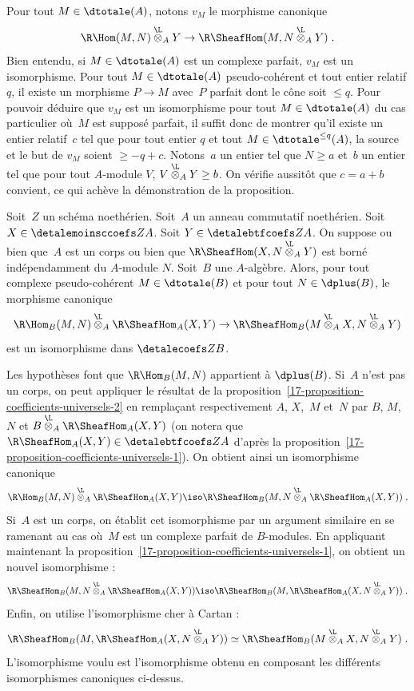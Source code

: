 \documentclass[10pt]{../fichiers-configuration-latex/smfart}
\begin{document}
Pour tout $M\in\dtotale(A)$, notons $v_M$ le morphisme canonique \[
\R\Hom(M,N)\overset{\L}{\otimes}_A Y\to
\R\SheafHom(M,N\overset{\L}{\otimes}_A Y)\;\text{.} \] Bien
entendu, si $M\in\dtotale(A)$ est un complexe parfait, $v_M$ est un
isomorphisme. Pour tout $M\in\dtotale(A)$ pseudo-cohérent
et tout entier relatif $q$, il
existe un morphisme $P\to M$ avec $P$ parfait dont le cône soit $\leq q$.
Pour pouvoir déduire que $v_M$ est un isomorphisme pour tout
$M\in\dtotale(A)$ du cas particulier où $M$ est supposé parfait, il suffit
donc de montrer qu'il existe un entier relatif $c$ tel que pour tout entier
$q$ et tout $M\in\dtotale^{\leq q}(A)$, la source et le but de $v_M$
soient $\geq -q+c$. Notons $a$ un entier tel que $N\geq a$ et $b$ un entier
tel que pour tout $A$-module $V$, $V\overset{\L}{\otimes}_A Y\geq b$.
On vérifie aussitôt que $c=a+b$ convient, ce qui achève la démonstration de
la proposition.

\begin{proposition2}\label{17-proposition-coefficients-universels-3}
Soit $Z$ un schéma noethérien. Soit $A$ un anneau commutatif noethérien.
Soit $X\in \detalemoinsccoefs Z A$. Soit $Y\in\detalebtfcoefs Z A$. On suppose ou
bien que $A$ est un corps ou bien que
$\R\SheafHom(X,N\overset{\L}{\otimes}_{A} Y)$ est borné
indépendamment du $A$-module $N$. Soit $B$ une $A$-algèbre.
Alors, pour tout complexe pseudo-cohérent
$M\in\dtotale(B)$ et pour tout $N\in\dplus(B)$, le morphisme canonique
\[\R\Hom_B(M,N)\overset{\L}{\otimes}_A \R\SheafHom_A(X,Y)
\to \R\SheafHom_B(M\overset{\L}{\otimes}_A X,
N\overset{\L}{\otimes}_A Y)\]
est un isomorphisme dans $\detalecoefs Z B$.
\end{proposition2}

Les hypothèses font que $\R\Hom_B(M,N)$ appartient à $\dplus(B)$.
Si $A$ n'est pas un corps, 
on peut appliquer le résultat de la
proposition~\ref{17-proposition-coefficients-universels-2} en remplaçant
respectivement $A$, $X$, $M$ et $N$ par $B$, $M$, $N$ et
$B\overset{\L}{\otimes}_A \R\SheafHom_A(X,Y)$ (on notera que
$\R\SheafHom_A(X,Y)\in\detalebtfcoefs Z A$ d'après la
proposition~\ref{17-proposition-coefficients-universels-1}). On obtient ainsi
un isomorphisme canonique
\[\R\Hom_B(M,N)\overset{\L}{\otimes}_A
\R\SheafHom_A(X,Y)\iso
\R\SheafHom_B(M,N\overset{\L}{\otimes}_A\R\SheafHom_A(X,Y))\;\text{.}\]
Si $A$ est un corps, on établit cet isomorphisme par un argument similaire
en se ramenant au cas où $M$ est un complexe parfait de $B$-modules.
En appliquant maintenant la
proposition~\ref{17-proposition-coefficients-universels-1}, on obtient un
nouvel isomorphisme :
\[\R\SheafHom_B(M,N\overset{\L}{\otimes}_A\R\SheafHom_A(X,Y))\iso
\R\SheafHom_B(M,\R\SheafHom_A(X,N\overset{\L}{\otimes}_A
Y))\;\text{.}\]
Enfin, on utilise l'isomorphisme cher à Cartan :
\[\R\SheafHom_B(M,\R\SheafHom_A(X,N\overset{\L}{\otimes}_A
Y))\simeq
\R\SheafHom_B(M\overset{\L}{\otimes}_A X,
N\overset{\L}{\otimes}_A Y)\;\text{.}\]
L'isomorphisme voulu est l'isomorphisme obtenu en composant les différents
isomorphismes canoniques ci-dessus.
\end{document}
